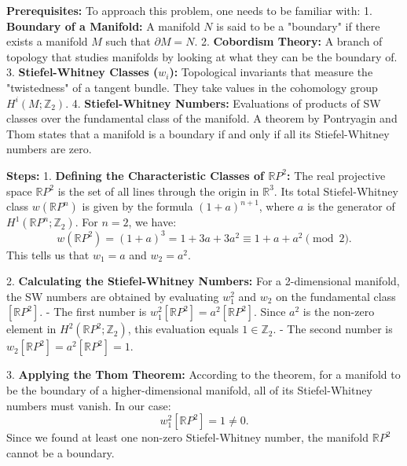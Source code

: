 \begin{solution}
\textbf{Prerequisites:}
To approach this problem, one needs to be familiar with:
1. \textbf{Boundary of a Manifold:} A manifold $N$ is said to be a "boundary" if there exists a manifold $M$ such that $\partial M = N$.
2. \textbf{Cobordism Theory:} A branch of topology that studies manifolds by looking at what they can be the boundary of.
3. \textbf{Stiefel-Whitney Classes ($w_i$):} Topological invariants that measure the "twistedness" of a tangent bundle. They take values in the cohomology group $H^i(M; \mathbb{Z}_2)$.
4. \textbf{Stiefel-Whitney Numbers:} Evaluations of products of SW classes over the fundamental class of the manifold. A theorem by Pontryagin and Thom states that a manifold is a boundary if and only if all its Stiefel-Whitney numbers are zero.
\par\vspace{\baselineskip}

\textbf{Steps:}
1. \textbf{Defining the Characteristic Classes of $\mathbb{R}P^2$:}
The real projective space $\mathbb{R}P^2$ is the set of all lines through the origin in $\mathbb{R}^3$. Its total Stiefel-Whitney class $w(\mathbb{R}P^n)$ is given by the formula $(1+a)^{n+1}$, where $a$ is the generator of $H^1(\mathbb{R}P^n; \mathbb{Z}_2)$. For $n=2$, we have:
\[ w(\mathbb{R}P^2) = (1+a)^3 = 1 + 3a + 3a^2 \equiv 1 + a + a^2 \pmod 2. \]
This tells us that $w_1 = a$ and $w_2 = a^2$.
\par\vspace{\baselineskip}

2. \textbf{Calculating the Stiefel-Whitney Numbers:}
For a 2-dimensional manifold, the SW numbers are obtained by evaluating $w_1^2$ and $w_2$ on the fundamental class $[\mathbb{R}P^2]$.
- The first number is $w_1^2[\mathbb{R}P^2] = a^2[\mathbb{R}P^2]$. Since $a^2$ is the non-zero element in $H^2(\mathbb{R}P^2; \mathbb{Z}_2)$, this evaluation equals $1 \in \mathbb{Z}_2$.
- The second number is $w_2[\mathbb{R}P^2] = a^2[\mathbb{R}P^2] = 1$.
\par\vspace{\baselineskip}

3. \textbf{Applying the Thom Theorem:}
According to the theorem, for a manifold to be the boundary of a higher-dimensional manifold, all of its Stiefel-Whitney numbers must vanish. In our case:
\[ w_1^2[\mathbb{R}P^2] = 1 \neq 0. \]
Since we found at least one non-zero Stiefel-Whitney number, the manifold $\mathbb{R}P^2$ cannot be a boundary.
\par\vspace{\baselineskip}


\end{solution}
